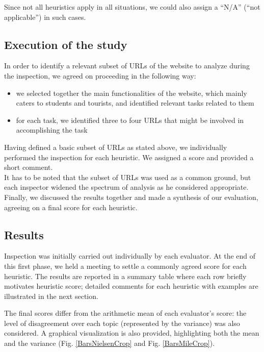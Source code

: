 Since not all heuristics apply in all situations, we could also assign a ``N/A'' (``not applicable'') in such cases.

\subsection{Execution of the study}
In order to identify a relevant subset of URLs of the website to analyze during the inspection, we agreed on proceeding in the following way:
\begin{itemize}
    \item we selected together the main functionalities of the website, which mainly caters to students and tourists, and identified relevant tasks related to them
    \item for each task, we identified three to four URLs that might be involved in accomplishing the task
\end{itemize}
Having defined a basic subset of URLs as stated above, we individually performed the inspection for each heuristic. We assigned a score and provided a short comment. \\
It has to be noted that the subset of URLs was used as a common ground, but each inspector widened the spectrum of analysis as he considered appropriate.\\
Finally, we discussed the results together and made a synthesis of our evaluation, agreeing on a final score for each heuristic.   


\pagebreak

\subsection{Results}
Inspection was initially carried out individually by each evaluator. At the end of this first phase, we held a meeting to settle a commonly agreed score for each heuristic.
The results are reported in a summary table where each row briefly motivates heuristic score; detailed comments for each heuristic with examples are illustrated in the next section.

The final scores differ from the arithmetic mean of each evaluator's score: the level of disagreement over each topic (represented by the variance) was also considered. A graphical visualization is also provided, highlighting both the mean and the variance (Fig. \ref{BarsNielsenCrop} and Fig. \ref{BarsMileCrop}).

